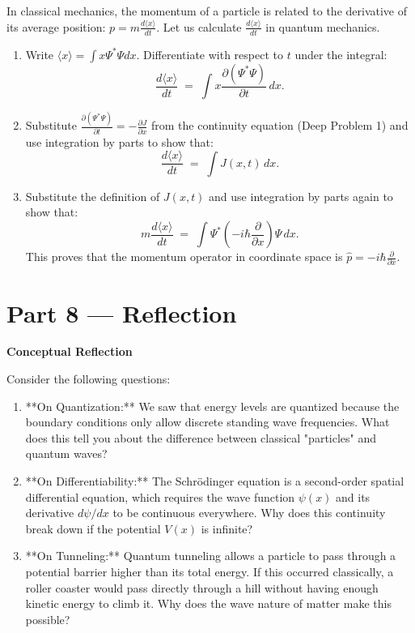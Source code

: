 \documentclass[12pt, a4paper, twoside]{book}
\newcounter{problem}[chapter]
\begin{document}
\begin{deepproblem}
In classical mechanics, the momentum of a particle is related to the derivative of its average position: $p = m \frac{d\langle x \rangle}{dt}$.
Let us calculate $\frac{d\langle x \rangle}{dt}$ in quantum mechanics.
\begin{enumerate}[label=(\alph*)]
  \item Write $\langle x \rangle = \int x \Psi^* \Psi dx$. Differentiate with respect to $t$ under the integral:
  \[
    \frac{d\langle x \rangle}{dt} \;=\; \int x \frac{\partial(\Psi^* \Psi)}{\partial t} \, dx.
  \]
  \item Substitute $\frac{\partial(\Psi^* \Psi)}{\partial t} = -\frac{\partial J}{\partial x}$ from the continuity equation (Deep Problem 1) and use integration by parts to show that:
  \[
    \frac{d\langle x \rangle}{dt} \;=\; \int J(x, t) \, dx.
  \]
  \item Substitute the definition of $J(x, t)$ and use integration by parts again to show that:
  \[
    m \frac{d\langle x \rangle}{dt} \;=\; \int \Psi^* \left( -i\hbar \frac{\partial}{\partial x} \right) \Psi \, dx.
  \]
  This proves that the momentum operator in coordinate space is $\hat{p} = -i\hbar \frac{\partial}{\partial x}$.
\end{enumerate}
\end{deepproblem}

\newpage

\section{Part 8 --- Reflection}

\begin{reflectionbox}
\textbf{Conceptual Reflection}

Consider the following questions:
\begin{enumerate}
  \item **On Quantization:** We saw that energy levels are quantized because the boundary conditions only allow discrete standing wave frequencies. What does this tell you about the difference between classical "particles" and quantum waves?
  \item **On Differentiability:** The Schrödinger equation is a second-order spatial differential equation, which requires the wave function $\psi(x)$ and its derivative $d\psi/dx$ to be continuous everywhere. Why does this continuity break down if the potential $V(x)$ is infinite?
  \item **On Tunneling:** Quantum tunneling allows a particle to pass through a potential barrier higher than its total energy. If this occurred classically, a roller coaster would pass directly through a hill without having enough kinetic energy to climb it. Why does the wave nature of matter make this possible?
\end{enumerate}
\end{reflectionbox}
\end{document}
